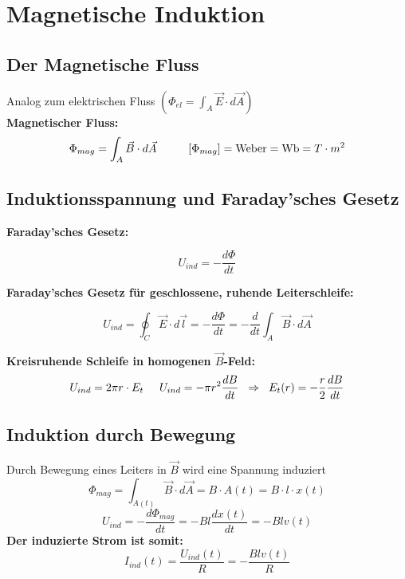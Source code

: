 \section{Magnetische Induktion}

\subsection{Der Magnetische Fluss}
Analog zum elektrischen Fluss $( \Phi_{el} = \int_A \Vec{E} \cdot d\Vec{A} )$
\\[1ex]
\textbf{Magnetischer Fluss:}
\[
    \Phi_{mag} = \int_A \Vec{B} \cdot d\Vec{A} \hspace{10mm} [\Phi_{mag}] = \text{Weber} = \text{Wb} = T\cdot m^2
\]

\subsection{Induktionsspannung und Faraday'sches Gesetz}

\textbf{Faraday'sches Gesetz:}
\begin{formulabox}
    \[
        U_{ind} = -\frac{d\Phi}{dt}
    \]
\end{formulabox}
\textbf{Faraday'sches Gesetz für geschlossene, ruhende Leiterschleife:}
\begin{formulabox}
    \[
        U_{ind} = \oint_C \Vec{E} \cdot d\Vec{l} = - \frac{d\Phi}{dt} = -\frac{d}{dt}\int_A \Vec{B} \cdot d\Vec{A}
    \]
\end{formulabox}

\textbf{Kreisruhende Schleife in homogenen $\Vec{B}$-Feld:}
\[
    U_{ind} = 2\pi r \cdot E_t \hspace{5mm} U_{ind} = -\pi r^2 \frac{dB}{dt} \hspace{2mm} \Rightarrow \hspace{2mm} E_{t}(r) = -\frac{r}{2}\frac{dB}{dt}
\]

\subsection{Induktion durch Bewegung}
Durch Bewegung eines Leiters in $\Vec{B}$ wird eine Spannung induziert \\
\[
    \Phi_{mag} = \int_{A(t)} \Vec{B} \cdot d\vec{A} = B \cdot A(t) = B \cdot l \cdot x(t)
\]\[
    U_{ind} = -\frac{d\Phi_{mag}}{dt} = -Bl\frac{dx(t)}{dt} = - Blv(t)
\]
\textbf{Der induzierte Strom ist somit:}
\[
    I_{ind}(t) = \frac{U_{ind}(t)}{R} = - \frac{Blv(t)}{R}
\]


